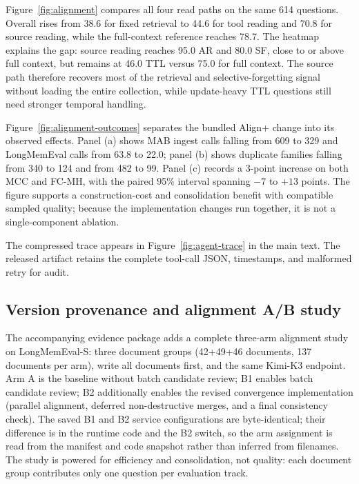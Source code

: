 

Figure~\ref{fig:alignment} compares all four read paths on the same 614 questions. Overall rises from 38.6 for fixed retrieval to 44.6 for tool reading and 70.8 for source reading, while the full-context reference reaches 78.7. The heatmap explains the gap: source reading reaches 95.0 AR and 80.0 SF, close to or above full context, but remains at 46.0 TTL versus 75.0 for full context. The source path therefore recovers most of the retrieval and selective-forgetting signal without loading the entire collection, while update-heavy TTL questions still need stronger temporal handling.

Figure~\ref{fig:alignment-outcomes} separates the bundled Align+ change into its observed effects. Panel (a) shows MAB ingest calls falling from 609 to 329 and LongMemEval calls from 63.8 to 22.0; panel (b) shows duplicate families falling from 340 to 124 and from 482 to 99. Panel (c) records a 3-point increase on both MCC and FC-MH, with the paired 95\% interval spanning $-7$ to $+13$ points. The figure supports a construction-cost and consolidation benefit with compatible sampled quality; because the implementation changes run together, it is not a single-component ablation.

The compressed trace appears in Figure~\ref{fig:agent-trace} in the main text. The released artifact retains the complete tool-call JSON, timestamps, and malformed retry for audit.


\subsection{Version provenance and alignment A/B study}
\label{app:alignment-ab}

The accompanying evidence package adds a complete three-arm alignment study on LongMemEval-S: three document groups (42+49+46 documents, 137 documents per arm), write all documents first, and the same Kimi-K3 endpoint. Arm A is the baseline without batch candidate review; B1 enables batch candidate review; B2 additionally enables the revised convergence implementation (parallel alignment, deferred non-destructive merges, and a final consistency check). The saved B1 and B2 service configurations are byte-identical; their difference is in the runtime code and the B2 switch, so the arm assignment is read from the manifest and code snapshot rather than inferred from filenames. The study is powered for efficiency and consolidation, not quality: each document group contributes only one question per evaluation track.

